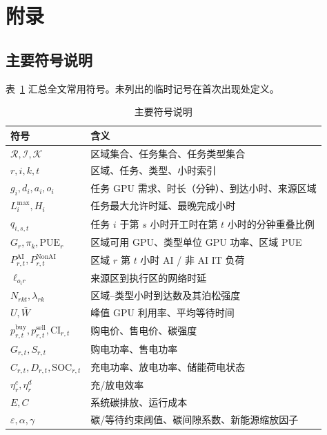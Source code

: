 \documentclass[UTF8,a4paper,zihao=-4]{ctexart}
\begin{document}
\newpage
{}




\section{附录}

\subsection{主要符号说明}

表~\ref{tab:app-symbols} 汇总全文常用符号。未列出的临时记号在首次出现处定义。

\begin{table}[H]
\centering
\small
\caption{主要符号说明}
\label{tab:app-symbols}
\setlength{\tabcolsep}{4pt}
\begin{tabular}{ll}
\toprule
符号 & 含义 \\
\midrule
$\mathcal{R},\mathcal{I},\mathcal{K}$ & 区域集合、任务集合、任务类型集合 \\
$r,i,k,t$ & 区域、任务、类型、小时索引 \\
$g_i,d_i,a_i,o_i$ & 任务 GPU 需求、时长（分钟）、到达小时、来源区域 \\
$L_i^{\max},H_i$ & 任务最大允许时延、最晚完成小时 \\
$q_{i,s,t}$ & 任务 $i$ 于第 $s$ 小时开工时在第 $t$ 小时的分钟重叠比例 \\
$G_r,\pi_k,\mathrm{PUE}_r$ & 区域可用 GPU、类型单位 GPU 功率、区域 PUE \\
$P_{r,t}^{\mathrm{AI}},P_{r,t}^{\mathrm{NonAI}}$ & 区域 $r$ 第 $t$ 小时 AI / 非 AI IT 负荷 \\
$\ell_{o_i r}$ & 来源区到执行区的网络时延 \\
$N_{rkt},\lambda_{rk}$ & 区域--类型小时到达数及其泊松强度 \\
$U,\bar{W}$ & 峰值 GPU 利用率、平均等待时间 \\
$p^{\mathrm{buy}}_{r,t},p^{\mathrm{sell}}_{r,t},\mathrm{CI}_{r,t}$ & 购电价、售电价、碳强度 \\
$G_{r,t},S_{r,t}$ & 购电功率、售电功率 \\
$C_{r,t},D_{r,t},\mathrm{SOC}_{r,t}$ & 充电功率、放电功率、储能荷电状态 \\
$\eta_r^{c},\eta_r^{d}$ & 充/放电效率 \\
$E,C$ & 系统碳排放、运行成本 \\
$\varepsilon,\alpha,\gamma$ & 碳/等待约束阈值、碳间隙系数、新能源缩放因子 \\
\bottomrule
\end{tabular}
\end{table}
\end{document}
